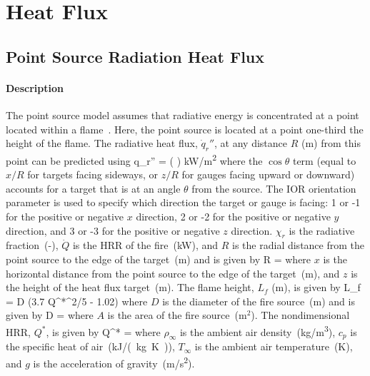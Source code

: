 
\chapter{Heat Flux}
\label{Heat_Flux_Chapter}

\section{Point Source Radiation Heat Flux}

\subsubsection*{Description}

The point source model assumes that radiative energy is concentrated at a point located within a flame~\cite{Beyler2:SFPE}.
Here, the point source is located at a point one-third the height of the flame.
The radiative heat flux, $\dot q_r''$, at any distance $R$ (\si{m}) from this point can be predicted using
\be
\dot q_r'' = \cos\theta \left(  \right) \quad \si{kW/m^2}
\label{eq:point_source}
\ee
where the $\cos\theta$ term (equal to $x/R$ for targets facing sideways, or $z/R$ for gauges facing upward or downward) accounts for a target that is at an angle $\theta$ from the source. The IOR orientation parameter is used to specify which direction the target or gauge is facing: 1 or -1 for the positive or negative $x$ direction, 2 or -2 for the positive or negative $y$ direction, and 3 or -3 for the positive or negative $z$ direction. $\chi_r$ is the radiative fraction~(-), $\dot Q$ is the HRR of the fire~(\si{kW}), and $R$ is the radial distance from the point source to the edge of the target~(\si{m}) and is given by
\be
R = 
\label{eq:point_source_R}
\ee
where $x$ is the horizontal distance from the point source to the edge of the target~(\si{m}), and $z$ is the height of the heat flux target~(\si{m}). The flame height, $L_f$ (\si{m}), is given by
\be
L_f = D (3.7 Q^{*^{2/5}} - 1.02)
\label{eq:point_source_Lf}
\ee
where $D$ is the diameter of the fire source~(\si{m}) and is given by
\be
D = 
\label{eq:point_source_D}
\ee
where $A$ is the area of the fire source~(m$^2$). The nondimensional HRR, $Q^*$, is given by
\be
Q^* = 
\label{eq:point_source_Qstar}
\ee
where $\rho_\infty$ is the ambient air density~(\si{kg/m^3}), $c_p$ is the specific heat of air~(\si{kJ/(kg.K)}), $T_\infty$ is the ambient air temperature~(\si{K}), and $g$ is the acceleration of gravity~(\si{m/s^2}).

